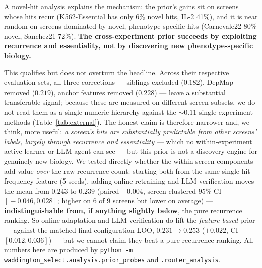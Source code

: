 \documentclass[11pt]{article}
\begin{document}
\noindent
A novel-hit analysis explains the mechanism: the prior's gains sit on screens whose hits recur
(K562-Essential has only 6\% novel hits, IL-2 41\%), and it is near random on screens dominated by novel,
phenotype-specific hits (Carnevale22 80\% novel, Sanchez21 72\%). \textbf{The cross-experiment prior
succeeds by exploiting recurrence and essentiality, not by discovering new phenotype-specific biology.}

This qualifies but does not overturn the headline. Across their respective evaluation sets, all three
corrections --- siblings excluded ($0.182$), DepMap removed ($0.219$), anchor features removed ($0.228$)
--- leave a substantial transferable signal; because these are measured on different screen subsets, we do
not read them as a single numeric hierarchy against the $\sim\!0.11$ single-experiment methods
(Table~\ref{tab:external}). The honest claim is therefore narrower and, we think, more
useful: \emph{a screen's hits are substantially predictable from other screens' labels, largely through
recurrence and essentiality} --- which no within-experiment active learner or LLM agent can see --- but
this prior is not a discovery engine for genuinely new biology. We tested directly whether the
within-screen components add value \emph{over} the raw recurrence count: starting both from the same
single hit-frequency feature (5 seeds), adding online retraining and LLM verification moves the mean from
$0.243$ to $0.239$ (paired $-0.004$, screen-clustered $95\%$ CI $[\!-\!0.046, 0.028]$; higher on 6 of 9
screens but lower on average) --- \textbf{indistinguishable from, if anything slightly below}, the pure
recurrence ranking. So online adaptation and LLM verification do lift the \emph{feature-based} prior ---
against the matched final-configuration LOO, $0.231\!\rightarrow\!0.253$ ($+0.022$, CI $[0.012,0.036]$) ---
but we cannot claim they beat a pure recurrence ranking. All numbers here are produced by
\texttt{python -m waddington\_select.analysis.prior\_probes} and \texttt{.router\_analysis}.
\end{document}

